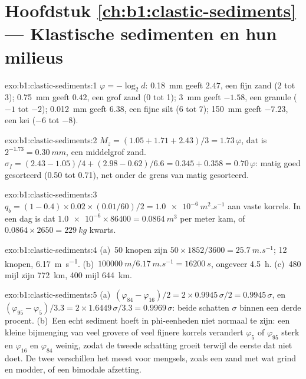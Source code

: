 \section*{Hoofdstuk \ref{ch:b1:clastic-sediments} --- Klastische sedimenten en hun milieus}

\begin{solution}{exo:b1:clastic-sediments:1}
$\varphi = -\log_2 d$: \qty{0.18}{mm} geeft $2.47$, een fijn zand (2 tot 3);
\qty{0.75}{mm} geeft $0.42$, een grof zand (0 tot 1); \qty{3}{mm} geeft
$-1.58$, een granule ($-1$ tot $-2$); \qty{0.012}{mm} geeft $6.38$, een fijne silt (6
tot 7); \qty{150}{mm} geeft $-7.23$, een kei ($-6$ tot $-8$).
\end{solution}

\begin{solution}{exo:b1:clastic-sediments:2}
$M_z = (1.05 + 1.71 + 2.43)/3 = 1.73\,\varphi$, dat is $2^{-1.73} =
\qty{0.30}{mm}$, een middelgrof zand. $\sigma_I = (2.43 - 1.05)/4 + (2.98 - 0.62)/6.6
= 0.345 + 0.358 = 0.70\,\varphi$: matig goed gesorteerd (0.50 tot 0.71), net
onder de grens van matig gesorteerd.
\end{solution}

\begin{solution}{exo:b1:clastic-sediments:3}
$q_b = (1 - 0.4) \times 0.02 \times (\num{0.01}/60)/2 = \qty{1.0e-6}{m^2.s^{-1}}$
aan vaste korrels. In een dag is dat $\num{1.0e-6} \times 86400 = \qty{0.0864}{m^3}$ per
meter kam, of $0.0864 \times 2650 = \qty{229}{kg}$ kwarts.
\end{solution}

\begin{solution}{exo:b1:clastic-sediments:4}
(a)~50 knopen zijn $50 \times 1852/3600 = \qty{25.7}{m.s^{-1}}$; 12 knopen,
\qty{6.17}{m.s^{-1}}. (b)~$\qty{100000}{m}/\qty{6.17}{m.s^{-1}} =
\qty{16200}{s}$, ongeveer \qty{4.5}{h}. (c)~480 mijl zijn \qty{772}{km}, 400 mijl
\qty{644}{km}.
\end{solution}

\begin{solution}{exo:b1:clastic-sediments:5}
(a)~$(\varphi_{84} - \varphi_{16})/2 = 2 \times 0.9945\,\sigma/2 =
0.9945\,\sigma$, en $(\varphi_{95} - \varphi_5)/3.3 = 2 \times
1.6449\,\sigma/3.3 = 0.9969\,\sigma$: beide schatten $\sigma$ binnen een derde
procent. (b)~Een echt sediment hoeft in phi-eenheden niet normaal te zijn: een kleine
bijmenging van veel grovere of veel fijnere korrels verandert $\varphi_5$ of
$\varphi_{95}$ sterk en $\varphi_{16}$ en $\varphi_{84}$ weinig, zodat de tweede schatting
groeit terwijl de eerste dat niet doet. De twee verschillen het meest voor mengsels, zoals
een zand met wat grind en modder, of een bimodale afzetting.
\end{solution}

